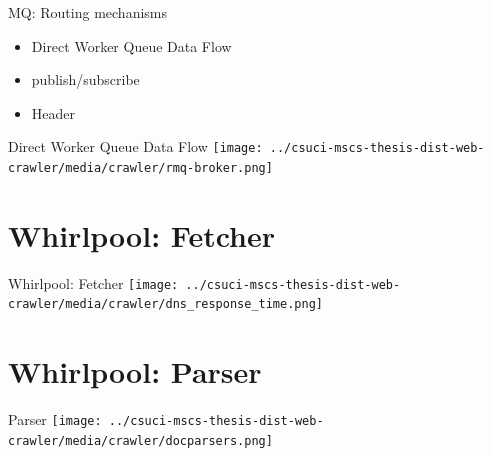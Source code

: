 \documentclass[9pt]{beamer}
\begin{document}

\begin{frame}{MQ: Routing mechanisms}
  \begin{itemize}
    \pause
  \item Direct Worker Queue Data Flow
    \pause
  \item publish/subscribe
    \pause
  \item Header
  \end{itemize}
\end{frame}


\begin{frame}{Direct Worker Queue Data Flow}
  \centering
  \texttt{[image: ../csuci-mscs-thesis-dist-web-crawler/media/crawler/rmq-broker.png]}
\end{frame}


\section[Fetcher]{Whirlpool: Fetcher}
\begin{frame}[plain]
\end{frame}


\begin{frame}{Whirlpool: Fetcher}
  \centering
  \texttt{[image: ../csuci-mscs-thesis-dist-web-crawler/media/crawler/dns\_response\_time.png]}
\end{frame}


\section[Parser]{Whirlpool: Parser}
\begin{frame}[plain]
\end{frame}


\begin{frame}{Parser}
  \centering
  \texttt{[image: ../csuci-mscs-thesis-dist-web-crawler/media/crawler/docparsers.png]}
\end{frame}

\end{document}
